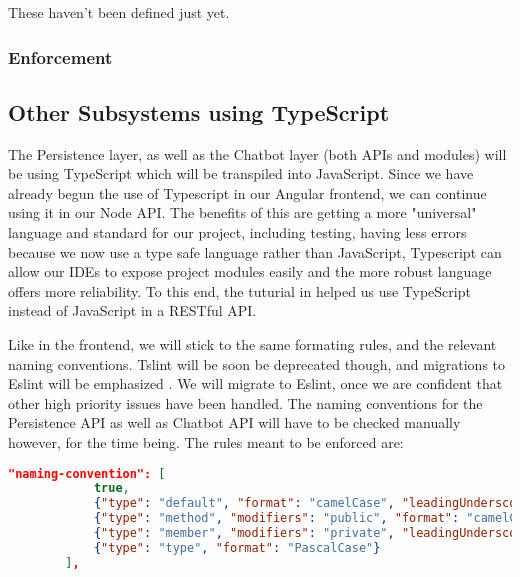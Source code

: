 \documentclass[11pt]{article}
\begin{document}
These haven't been defined just yet.

\subsubsection{Enforcement}

\subsection{Other Subsystems using TypeScript}

The Persistence layer, as well as the Chatbot layer (both APIs and modules) will be using TypeScript which will be transpiled into JavaScript. Since we have already begun the use of Typescript in our Angular frontend, we can continue using it in our Node API. The benefits of this are getting a more "universal" language and standard for our project, including testing, having less errors because we now use a type safe language rather than JavaScript, Typescript can allow our IDEs to expose project modules easily and the more robust language offers more reliability\cite{Website:9}. To this end, the tuturial in \cite{Website:9} helped us use TypeScript instead of JavaScript in a RESTful API.

Like in the frontend, we will stick to the same formating rules, and the relevant naming conventions. Tslint will be soon be deprecated though, and migrations to Eslint will be emphasized \cite{Website:13}. We will migrate to Eslint, once we are confident that other high priority issues have been handled. The naming conventions for the Persistence API as well as Chatbot API will have to be checked manually however, for the time being. The rules meant to be enforced are:

\begin{lstlisting}[language=json,firstnumber=1]
"naming-convention": [
            true,
            {"type": "default", "format": "camelCase", "leadingUnderscore": "forbid", "trailingUnderscore": "forbid"},
            {"type": "method", "modifiers": "public", "format": "camelCase"},
            {"type": "member", "modifiers": "private", "leadingUnderscore": "require"},
            {"type": "type", "format": "PascalCase"}
        ],
\end{lstlisting}
\end{document}
